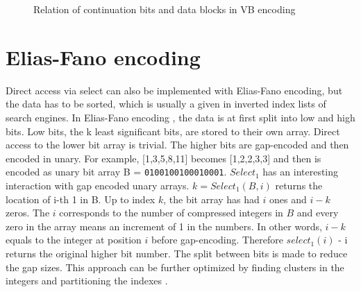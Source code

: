 \begin{figure}[ht]
\centering
{}
\caption{Relation of continuation bits and data blocks in VB encoding} \label{VBarrays}
\end{figure}


\section{Elias-Fano encoding}
Direct access via select can also be implemented with Elias-Fano encoding, but the data has to be sorted, which is usually a given in inverted index lists of search engines. In Elias-Fano encoding \citep{Eli74, Vig13}, 
the data is at first split into low and 
high bits. Low bits, the k least significant bits, are stored to their own array. Direct access to the lower bit array is trivial. The higher bits are gap-encoded and then encoded in unary. 
For example, [1,3,5,8,11] becomes [1,2,2,3,3] and then is encoded as unary bit array B = \texttt{0100100100010001}. $Select_1$ has an interesting interaction with gap encoded unary arrays. $k = Select_1(B,i)$ 
returns the location of i-th 1 in B. Up to index $k$, the bit array has had $i$ ones and $i-k$ zeros. The $i$ corresponds to the number of compressed integers in $B$ and every zero in the array 
means an increment of 1 in the numbers. In other words, $i-k$ equals to the integer at position $i$ before gap-encoding. Therefore $select_1(i)$ - i returns the original higher bit number. The split 
between bits is made to reduce the gap sizes.
This approach can be further optimized by finding clusters in the integers and partitioning the indexes \citep{Ott14}.

